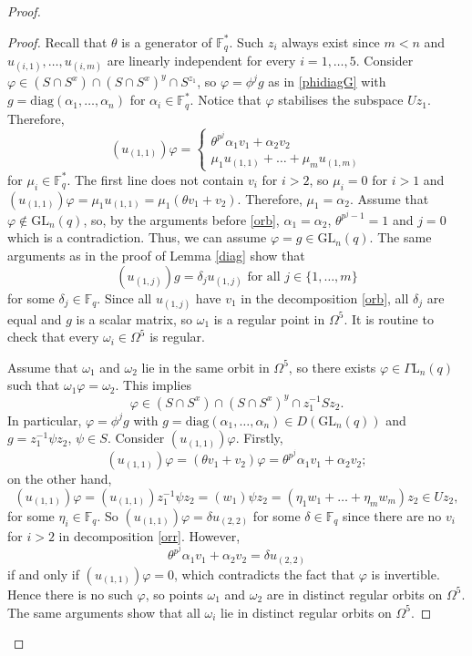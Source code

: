 \documentclass[a4paper,reqno,11pt]{amsart}
\theoremstyle{definition}
\theoremstyle{remark}
\numberwithin{equation}{section}
\newcommand{\diag}{\mathrm{diag}}
\newcommand{\GaL}{{\Gamma \mathrm{L}}}
\newcommand{\GL}{{\mathrm{GL}}}
\begin{document}
\begin{proof}
\begin{proof}
Recall that $\theta$ is a generator of $\mathbb{F}_q^*.$ Such $z_i$ always exist since $m<n$ and $u_{(i,1)}, \ldots, u_{(i,m)}$ are linearly independent  for every $i =1 ,\ldots, 5$. 
Consider $\varphi \in (S \cap S^x) \cap (S \cap S^x)^y \cap S^{z_1}$, so $\varphi=\phi^jg$ as in \eqref{phidiagG} with $g=\diag({\alpha_1, \ldots, \alpha_n})$ for $\alpha_i \in \mathbb{F}_q^*.$ Notice that $\varphi$ stabilises the subspace $Uz_1.$ 
Therefore, 
$$(u_{(1,1)})\varphi =
\begin{cases}
 \theta^{p^j} \alpha_1 v_1 + \alpha_2 v_2\\
 \mu_1 u_{(1,1)} + \ldots + \mu_m u_{(1,m)}
\end{cases}
$$ for $\mu_i \in \mathbb{F}_q^*.$ The first line does not contain $v_i$ for $i>2$, so $\mu_i=0$ for $i>1$ and $(u_{(1,1)})\varphi=\mu_1 u_{(1,1)}= \mu_1(\theta v_1 +v_2).$ Therefore, $\mu_1= \alpha_2.$  Assume  that $\varphi \notin \GL_n(q)$, so, by the arguments before \eqref{orb}, $\alpha_1 =\alpha_2$,  $\theta^{p^j-1}=1$ and $j=0$ which is a contradiction. Thus, we can assume $\varphi=g \in \GL_n(q).$
 The same arguments as in the proof of Lemma \ref{diag} show that $$(u_{(1,j)} )g = \delta_j u_{(1,j)} \text{ for all } j\in \{1,\ldots, m\}$$ for some $\delta_j \in \mathbb{F}_q$. Since all $u_{(1,j)}$ have $v_1$ in the decomposition \eqref{orb}, all $\delta_j$ are equal and $g$ is a scalar matrix, so $\omega_1$ is a regular point in $\Omega^5.$ It is routine to check that every $\omega_i \in \Omega^5$ is regular. 

Assume that $\omega_1$ and $\omega_2$ lie in the same orbit in $\Omega^5$, so there exists $\varphi \in \GaL_n(q)$ such that $\omega_1 \varphi =\omega_2$. This implies $$\varphi \in (S \cap S^x) \cap (S \cap S^x)^y \cap z_1^{-1}Sz_2.$$
In particular, $\varphi= \phi^j g$ with $g =\diag(\alpha_1, \ldots, \alpha_n) \in D(\GL_n(q))$ and $g=z_1^{-1}\psi z_2$, $\psi \in S$. Consider $(u_{(1,1)})\varphi$.  Firstly, 
\begin{equation}\label{orr}
(u_{(1,1)})\varphi=(\theta v_1+v_2)\varphi= \theta^{p^j} \alpha_1 v_1 + \alpha_2 v_2;
\end{equation}
on the other hand,
$$(u_{(1,1)})\varphi =(u_{(1,1)})z_1^{-1}\psi z_2=(w_{1})\psi z_2=(\eta_{1} w_{1} + \ldots +\eta_{m} w_{m})z_2 \in Uz_2,$$
for some $\eta_i \in \mathbb{F}_q$. So $(u_{(1,1)})\varphi= \delta u_{(2,2)}$ for some $\delta \in \mathbb{F}_q$ since there are no $v_i$ for $i>2$ in decomposition \eqref{orr}. However, 
$$\theta^{p^j} \alpha_1 v_1 + \alpha_2 v_2=\delta u_{(2,2)}$$
if and only if $(u_{(1,1)})\varphi=0$, which contradicts the fact that $\varphi$ is invertible. Hence  there is no such $\varphi$, so points $\omega_1$ and $\omega_2$ are in  distinct regular orbits on $\Omega^5.$ The same arguments show that all $\omega_i$ lie in  distinct regular orbits on $\Omega^5.$   


\end{proof}
\end{proof}
\end{document}
